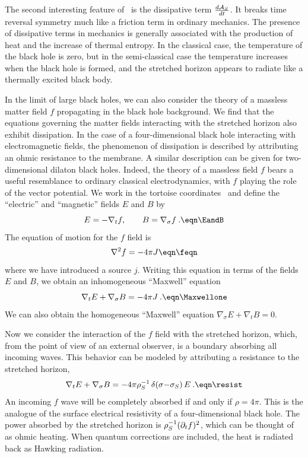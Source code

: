 The second interesting feature of \threesix\ is the dissipative term
${d{\cal A}_S \over dt}$.  It breaks time reversal symmetry much like
a friction term in ordinary mechanics.  The presence of dissipative
terms in mechanics is generally associated with the production of
heat and the increase of thermal entropy.  In the classical case, the
temperature of the black hole is zero, but in the semi-classical case
the temperature increases when the black hole is formed, and the
stretched horizon appears to radiate like a thermally excited black
body.

In the limit of large black holes, we can also consider the theory of
a massless matter field $f$ propagating in the black hole background.
 We find that the equations governing the matter fields interacting
with the stretched horizon also exhibit dissipation.  In the case of
a four-dimensional black hole interacting with electromagnetic
fields, the phenomenon of dissipation is described by attributing an
ohmic resistance to the
membrane.  A similar description can be given for two-dimensional
dilaton black holes.  Indeed, the theory of a massless field $f$
bears a useful resemblance to ordinary classical electrodynamics,
with $f$ playing the role of the vector potential.  We work in the
tortoise coordinates \tortone\ and define the ``electric'' and
``magnetic'' fields $E$ and $B$ by
$$
E = - \nabla_t f, \qquad B = \nabla_{\sigma} f \>.
\eqn\EandB
$$
The equation of motion for the $f$ field is
$$
\nabla^2 f = -4 \pi J
\eqn\feqn
$$
where we have introduced a source $j$.  Writing this equation in
terms of the fields $E$ and $B$, we obtain an inhomogeneous
``Maxwell'' equation
$$
\nabla_t E + \nabla_{\sigma} B
= -4 \pi J \>.
\eqn\Maxwellone
$$
We can also obtain the homogeneous ``Maxwell'' equation
$\nabla_{\sigma} E + \nabla_t B = 0$.

Now we consider the interaction of the $f$ field with the stretched
horizon, which, from the point of view of an external observer, is a
boundary absorbing all incoming waves.  This behavior can be modeled
by attributing a resistance to the stretched horizon,
$$
\nabla_t E + \nabla_{\sigma} B
= -4 \pi \rho_S^{-1}\, \delta (\sigma{-}\sigma_S)\, E \>.
\eqn\resist
$$
An incoming $f$ wave will be completely absorbed if and only if $\rho
= 4\pi$.  This is the analogue of the surface electrical resistivity
of a four-dimensional black hole.  The power absorbed by the
stretched horizon is $\rho_S^{-1} (\partial_t f)^2$, which can be thought
of as ohmic heating.  When quantum corrections are included, the heat
is radiated back as Hawking radiation.


